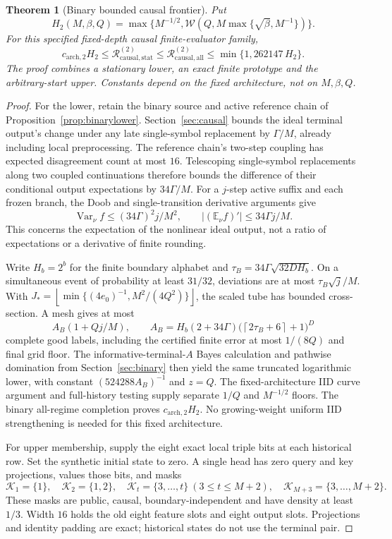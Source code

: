\documentclass[11pt,letterpaper]{article}
\newtheorem{theorem}{Theorem}[section]
\theoremstyle{definition}\newtheorem{definition}[theorem]{Definition}
\theoremstyle{remark}\newtheorem{remark}[theorem]{Remark}
\newcommand{\E}{\mathbb{E}}
\newcommand{\Var}{\operatorname{Var}}
\newcommand{\floor}[1]{\left\lfloor #1\right\rfloor}
\newcommand{\ceil}[1]{\left\lceil #1\right\rceil}
\newcommand{\Risk}{\mathcal{R}}
\begin{document}
\begin{theorem}[Binary bounded causal frontier]\label{thm:binarycausal}
Put
\[
 H_2(M,\beta,Q)=
 \max\{M^{-1/2},\mathcal W(Q,M\max\{\sqrt\beta,M^{-1}\})\}.
\]
For this specified fixed-depth causal finite-evaluator family,
\[
 c_{\mathrm{arch},2}H_2
 \le\Risk_{\mathrm{causal},\mathrm{stat}}^{(2)}
 \le\Risk_{\mathrm{causal},\mathrm{all}}^{(2)}
 \le\min\{1,262147\,H_2\}.
\]
The proof combines a stationary lower, an exact finite prototype and the arbitrary-start upper. Constants depend on the fixed architecture, not on $M,\beta,Q$.
\end{theorem}
\begin{proof}
For the lower, retain the binary source and active reference chain of Proposition~\ref{prop:binarylower}. Section~\ref{sec:causal} bounds the ideal terminal output's change under any late single-symbol replacement by $\Gamma/M$, already including local preprocessing. The reference chain's two-step coupling has expected disagreement count at most $16$. Telescoping single-symbol replacements along two coupled continuations therefore bounds the difference of their conditional output expectations by $34\Gamma/M$. For a $j$-step active suffix and each frozen branch, the Doob and single-transition derivative arguments give
\[
 \Var_\nu f\le(34\Gamma)^2j/M^2,\qquad
 |(\E_\nu f)'|\le34\Gamma j/M.
\]
This concerns the expectation of the nonlinear ideal output, not a ratio of expectations or a derivative of finite rounding.

Write $H_b=2^b$ for the finite boundary alphabet and
$\tau_B=34\Gamma\sqrt{32DH_b}$. On a simultaneous event of probability at least $31/32$, deviations are at most $\tau_B\sqrt j/M$. With
$J_*=\floor{\min\{(4e_0)^{-1},M^2/(4Q^2)\}}$,
the scaled tube has bounded cross-section. A mesh gives at most
\[
 A_B(1+Qj/M),\qquad
 A_B=H_b(2+34\Gamma)
      \bigl(\ceil{2\tau_B+6}+1\bigr)^D
\]
complete good labels, including the certified finite error at most $1/(8Q)$ and final grid floor. The informative-terminal-$A$ Bayes calculation and pathwise domination from Section~\ref{sec:binary} then yield the same truncated logarithmic lower, with constant $(524288A_B)^{-1}$ and $z=Q$.
The fixed-architecture IID curve argument and full-history testing supply separate $1/Q$ and $M^{-1/2}$ floors. The binary all-regime completion proves $c_{\mathrm{arch},2}H_2$. No growing-weight uniform IID strengthening is needed for this fixed architecture.

For upper membership, supply the eight exact local triple bits at each historical row. Set the synthetic initial state to zero. A single head has zero query and key projections, values those bits, and masks
\[
 \mathcal K_1=\{1\},\quad \mathcal K_2=\{1,2\},\quad
 \mathcal K_t=\{3,\ldots,t\}\ (3\le t\le M+2),\quad
 \mathcal K_{M+3}=\{3,\ldots,M+2\}.
\]
These masks are public, causal, boundary-independent and have density at least $1/3$. Width $16$ holds the old eight feature slots and eight output slots. Projections and identity padding are exact; historical states do not use the terminal pair.


\end{proof}
\end{document}

